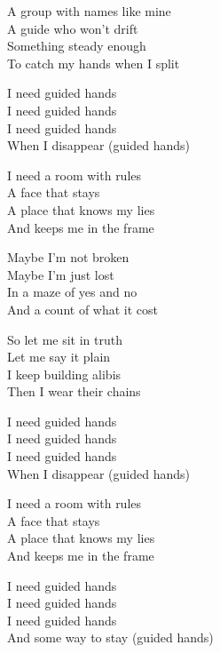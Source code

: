\begin{lyrics}
A group with names like mine\\
A guide who won't drift\\
Something steady enough\\
To catch my hands when I split

I need guided hands\\
I need guided hands\\
I need guided hands\\
When I disappear (guided hands)

I need a room with rules\\
A face that stays\\
A place that knows my lies\\
And keeps me in the frame

Maybe I'm not broken\\
Maybe I'm just lost\\
In a maze of yes and no\\
And a count of what it cost

So let me sit in truth\\
Let me say it plain\\
I keep building alibis\\
Then I wear their chains

I need guided hands\\
I need guided hands\\
I need guided hands\\
When I disappear (guided hands)

I need a room with rules\\
A face that stays\\
A place that knows my lies\\
And keeps me in the frame

I need guided hands\\
I need guided hands\\
I need guided hands\\
And some way to stay (guided hands)
\end{lyrics}

